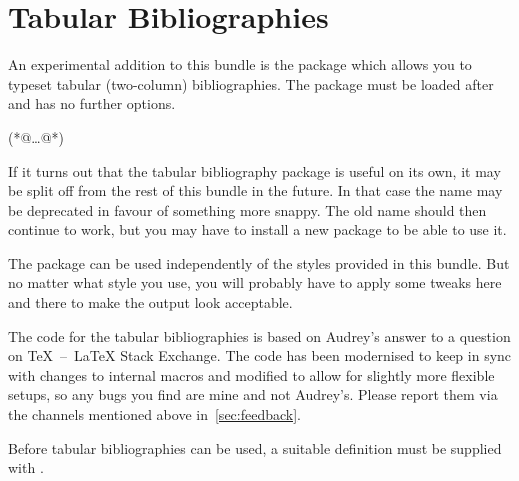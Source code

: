 \documentclass[DIV=9]{scrartcl}
\def\tex{TeX}%
\def\latex{LaTeX}%
\begin{document}
\clearpage
\section{Tabular Bibliographies}\label{sec:tabularbib}
\label{exltd@itm@biblatex-ext-tabular}
An experimental addition to this bundle is the package
 which allows you to typeset tabular
(two-column) bibliographies.
The package must be loaded after  and has no further options.
\begin{biblatexcode}
\usepackage[(*@@*)]{biblatex}
(*@\dots @*)
\usepackage{biblatex-ext-tabular}
\end{biblatexcode}
If it turns out that the tabular bibliography package is useful on its own,
it may be split off from the rest of this bundle in the future.
In that case the name  may be deprecated in favour
of something more snappy.
The old name should then continue to work, but you may have to install a new
package to be able to use it.

The package  can be used independently of the styles
provided in this bundle.
But no matter what style you use, you will probably have to apply some tweaks
here and there to make the output look acceptable.

The code for the tabular bibliographies is based on Audrey's%
answer to a question%
on \tex{}~--~\latex{} Stack Exchange.
The code has been modernised to keep in sync with changes to internal macros
and modified to allow for slightly more flexible setups, so any bugs you find
are mine and not Audrey's. Please report them via the channels mentioned above
in~\cref{sec:feedback}.

Before tabular bibliographies can be used, a suitable definition
must be supplied with .
\end{document}
